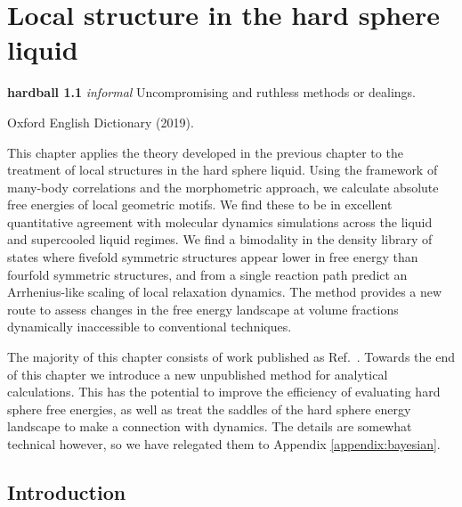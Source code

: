 \documentclass[11pt,twoside]{report}
\begin{document}
\chapter{Local structure in the hard sphere liquid}
\epigraph{\textbf{hardball 1.1} \emph{informal} Uncompromising and ruthless methods or dealings.}{Oxford English Dictionary (2019).}
\label{chapter:morphometric-applications}

This chapter applies the theory developed in the previous chapter to the treatment of local structures in the hard sphere liquid.
Using the framework of many-body correlations and the morphometric approach, we calculate absolute free energies of local geometric motifs.
We find these to be in excellent quantitative agreement with molecular dynamics simulations across the liquid and supercooled liquid regimes.
We find a bimodality in the density library of states where fivefold symmetric structures appear lower in free energy than fourfold symmetric structures, and from a single reaction path predict an Arrhenius-like scaling of local relaxation dynamics.
The method provides a new route to assess changes in the free energy landscape at volume fractions dynamically inaccessible to conventional techniques.

The majority of this chapter consists of work published as Ref.\ \cite{RobinsonPRL2019}.
Towards the end of this chapter we introduce a new unpublished method for analytical calculations.
This has the potential to improve the efficiency of evaluating hard sphere free energies, as well as treat the saddles of the hard sphere energy landscape to make a connection with dynamics.
The details are somewhat technical however, so we have relegated them to Appendix \ref{appendix:bayesian}.


\section{Introduction}
\end{document}
